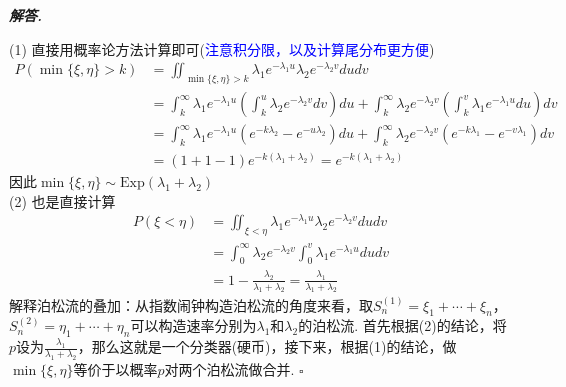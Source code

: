 \documentclass[10pt, a4paper, oneside]{ctexart}
\newenvironment{solution}{%
  \par\noindent\textbf{\textit{解答. }}\ignorespaces
}{%
  \hfill\ensuremath{\square}\par %
}
\begin{document}
\begin{solution}
    (1) 直接用概率论方法计算即可(\textcolor{blue}{注意积分限，以及计算尾分布更方便})
    \begin{align*}
        P(\min\{\xi,\eta\}>k)&=\iint_{\min\{\xi,\eta\}>k} \lambda_1e^{-\lambda_1 u}\lambda_2e^{-\lambda_2 v}du dv\\
        &=\int_{k}^{\infty}\lambda_1e^{-\lambda_1 u}\left(\int_{k}^u \lambda_2e^{-\lambda_2 v} dv\right)du+\int_{k}^{\infty}\lambda_2e^{-\lambda_2 v}\left(\int_{k}^v \lambda_1e^{-\lambda_1 u} du\right)dv\\
        &=\int_{k}^{\infty}\lambda_1e^{-\lambda_1 u}\left(e^{-k\lambda_2}-e^{-u\lambda_2}\right)du+\int_{k}^{\infty}\lambda_2e^{-\lambda_2 v}\left(e^{-k\lambda_1}-e^{-v\lambda_1}\right)dv\\
        &=(1+1-1)e^{-k(\lambda_1+\lambda_2)}=e^{-k(\lambda_1+\lambda_2)}
    \end{align*}
    因此$\min\{\xi,\eta\}\sim \text{Exp}(\lambda_1+\lambda_2)$\\
    (2) 也是直接计算
    \begin{align*}
        P(\xi<\eta)&=\iint_{\xi<\eta}\lambda_1e^{-\lambda_1 u}\lambda_2e^{-\lambda_2 v}du dv\\
        &=\int_0^{\infty} \lambda_2e^{-\lambda_2 v}\int_0^{v}\lambda_1e^{-\lambda_1 u}du dv\\
        &=1-\frac{\lambda_2}{\lambda_1+\lambda_2}=\frac{\lambda_1}{\lambda_1+\lambda_2}
    \end{align*}
    解释泊松流的叠加：从指数闹钟构造泊松流的角度来看，取$S_n^{(1)}=\xi_1+\cdots+\xi_n$，$S_n^{(2)}=\eta_1+\cdots+\eta_n$可以构造速率分别为$\lambda_1$和$\lambda_2$的泊松流. 首先根据(2)的结论，将$p$设为$\frac{\lambda_1}{\lambda_1+\lambda_2}$，那么这就是一个分类器(硬币)，接下来，根据(1)的结论，做$\min\{\xi,\eta\}$等价于以概率$p$对两个泊松流做合并.
\end{solution}
\end{document}
